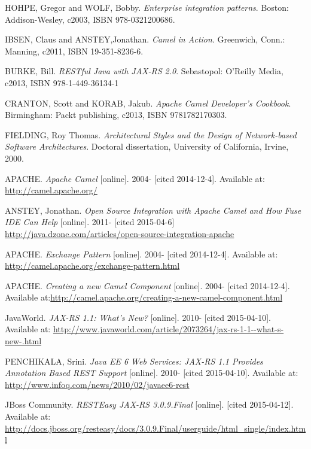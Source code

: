\documentclass[12pt,final,oneside]{fithesis2}
\begin{document}



\begin{thebibliography}{}


 HOHPE, Gregor and WOLF, Bobby. \textit{Enterprise integration patterns}. Boston: Addison-Wesley, c2003, ISBN 978-0321200686.

 IBSEN, Claus and ANSTEY,Jonathan. \textit{Camel in Action}. Greenwich, Conn.: Manning, c2011, ISBN 19-351-8236-6.

 BURKE, Bill. \textit{RESTful Java with JAX-RS 2.0}. Sebastopol: O'Reilly Media, c2013, ISBN 978-1-449-36134-1

 CRANTON, Scott and KORAB, Jakub. \textit{Apache Camel Developer's Cookbook}.  Birmingham: Packt publishing, c2013, ISBN 9781782170303.

 FIELDING, Roy Thomas. \textit{Architectural Styles and the Design of Network-based Software Architectures}. Doctoral dissertation, University of California, Irvine, 2000. 

 APACHE. \textit{Apache Camel} [online]. 2004- [cited 2014-12-4]. Available at: \url{http://camel.apache.org/}

 ANSTEY, Jonathan. \textit{Open Source Integration with Apache Camel and How Fuse IDE Can Help} [online]. 2011- [cited 2015-04-6] \url{http://java.dzone.com/articles/open-source-integration-apache}

 APACHE. \textit{Exchange Pattern} [online]. 2004- [cited 2014-12-4]. Available at: \url{http://camel.apache.org/exchange-pattern.html}

  APACHE. \textit{Creating a new Camel Component} [online]. 2004- [cited 2014-12-4]. Available at:\url{http://camel.apache.org/creating-a-new-camel-component.html}




 JavaWorld. \textit{JAX-RS 1.1: What's New?} [online]. 2010- [cited 2015-04-10]. Available at: \url{http://www.javaworld.com/article/2073264/jax-rs-1-1--what-s-new-.html}


  PENCHIKALA, Srini. \textit{
Java EE 6 Web Services: JAX-RS 1.1 Provides Annotation Based REST Support} [online]. 2010- [cited 2015-04-10]. Available at: \url{http://www.infoq.com/news/2010/02/javaee6-rest}

 JBoss Community. \textit{RESTEasy JAX-RS 3.0.9.Final} [online]. [cited 2015-04-12]. Available at: \url{http://docs.jboss.org/resteasy/docs/3.0.9.Final/userguide/html_single/index.html}


\end{thebibliography}
\end{document}
